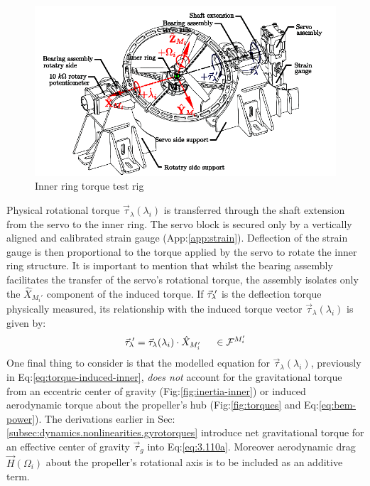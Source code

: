 \begin{figure}[htpb]
\centering
\includegraphics[width=\textwidth]{figs/torque-inner}
\caption{Inner ring torque test rig}
\label{fig:torque-inner}
\vspace{-12pt}
\end{figure}
\par
Physical rotational torque $\vec{\tau}_\lambda(\lambda_i)$ is transferred through the shaft extension from the servo to the inner ring. The servo block is secured only by a vertically aligned and calibrated strain gauge (App:\ref{app:strain}). Deflection of the strain gauge is then proportional to the torque applied by the servo to rotate the inner ring structure. It is important to mention that whilst the bearing assembly facilitates the transfer of the servo's rotational torque, the assembly isolates only the $\hat{X}_{M_i'}$ component of the induced torque. If $\vec{\tau}_{\lambda}\text{}\hspace{-2pt}'$ is the deflection torque physically measured, its relationship with the induced torque vector $\vec{\tau}_{\lambda}(\lambda_i)$ is given by:
\begin{equation}\label{eq:tau-lambda-prime}
\vec{\tau}_{\lambda}\text{}\hspace{-2pt}'=\vec{\tau}_{\lambda}(\lambda_i)\cdot\hat{X}_{M_i'}~~~~\in\mathcal{F}^{M_i'}
\end{equation}
One final thing to consider is that the modelled equation for $\vec{\tau}_\lambda(\lambda_i)$, previously in Eq:\ref{eq:torque-induced-inner}, \emph{does not} account for the gravitational torque from an eccentric center of gravity (Fig:\ref{fig:inertia-inner}) or induced aerodynamic torque about the propeller's hub (Fig:\ref{fig:torques} and Eq:\ref{eq:bem-power}). The derivations earlier in Sec:\ref{subsec:dynamics.nonlinearities.gyrotorques} introduce net gravitational torque for an effective center of gravity $\vec{\tau}_g$ into Eq:\ref{eq:3.110a}. Moreover aerodynamic drag $\vec{H}(\Omega_i)$ about the propeller's rotational axis is to be included as an additive term. 
